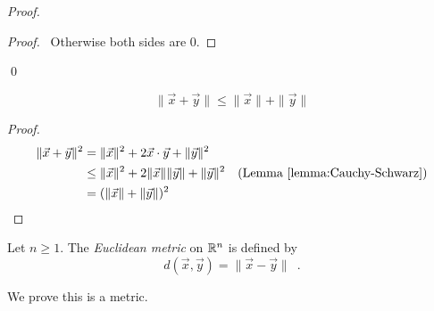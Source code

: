 \begin{proof}
    \pf
    \begin{proof}
        \pf\ Otherwise both sides are 0.
    \end{proof}
    \qed
\end{proof}

\begin{lemma}
    \label{lemma:triangle_inequality}
    \[ \| \vec{x} + \vec{y} \| \leq \| \vec{x} \| + \| \vec{y} \| \]
\end{lemma}

\begin{proof}
    \pf
    \begin{align*}
        \| \vec{x} + \vec{y} \|^2 & = \| \vec{x} \|^2 + 2 \vec{x} \cdot \vec{y} + \| \vec{y} \|^2 \\
        & \leq \| \vec{x} \|^2 + 2 \| \vec{x} \| \| \vec{y} \| + \| \vec{y} \|^2 & (\text{Lemma \ref{lemma:Cauchy-Schwarz}}) \\
        & = (\| \vec{x} \| + \| \vec{y} \|)^2 & \qed
    \end{align*}
\end{proof}

\begin{definition}
    Let $n \geq 1$. The \emph{Euclidean metric} on $\RR^n$ is defined by
    \[ d(\vec{x}, \vec{y}) = \| \vec{x} - \vec{y} \| \enspace . \]
\end{definition}

We prove this is a metric.

